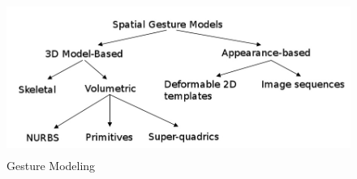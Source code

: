 \begin{figure}
	[h] \centering 
	\includegraphics[height=5cm]{figures/content/ges-model.png} \caption{Gesture Modeling} \label{fg:ges:model} 
\end{figure}
